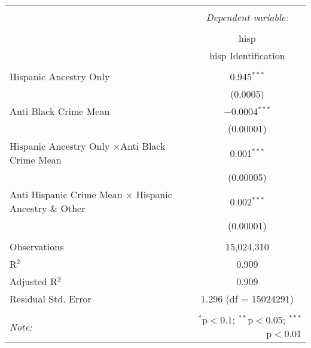 \documentclass{article}
\begin{document}
    \begin{table}[!htbp] \centering 
      \caption{} 
      \label{} 
    \begin{tabular}{@{\extracolsep{5pt}}lc} 
    \\[-1.8ex]\hline 
    \hline \\[-1.8ex] 
     & \multicolumn{1}{c}{\textit{Dependent variable:}} \\ 
    \cline{2-2} 
    \\[-1.8ex] & hisp \\ 
     & hisp Identification \\ 
    \hline \\[-1.8ex] 
     Hispanic Ancestry Only & 0.945$^{***}$ \\ 
      & (0.0005) \\ 
     Anti Black Crime Mean  & $-$0.0004$^{***}$ \\ 
      & (0.00001) \\ 
     Hispanic Ancestry Only $\times$Anti Black Crime Mean  & 0.001$^{***}$ \\ 
      & (0.00005) \\ 
     Anti Hispanic Crime Mean $\times$ Hispanic Ancestry \& Other & 0.002$^{***}$ \\ 
      & (0.00001) \\ 
    \hline \\[-1.8ex] 
    Observations & 15,024,310 \\ 
    R$^{2}$ & 0.909 \\ 
    Adjusted R$^{2}$ & 0.909 \\ 
    Residual Std. Error & 1.296 (df = 15024291) \\ 
    \hline 
    \hline \\[-1.8ex] 
    \textit{Note:}  & \multicolumn{1}{r}{$^{*}$p$<$0.1; $^{**}$p$<$0.05; $^{***}$p$<$0.01} \\ 
    \end{tabular} 
    \end{table} 


\newpage
\end{document}
